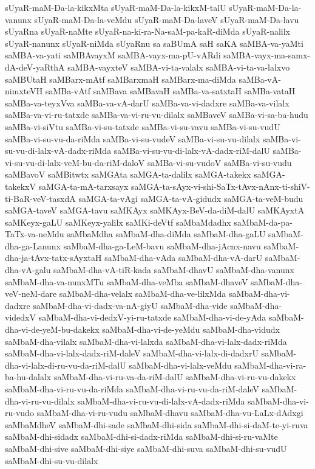 {sUyaR-maM-Da-la-kikxMta
sUyaR-maM-Da-la-kikxM-talU
sUyaR-maM-Da-la-vanunx
sUyaR-maM-Da-la-veMdu
sUyaR-maM-Da-laveV
sUyaR-maM-Da-lavu
sUyaRna
sUyaR-naMte
sUyaR-na-ki-ra-Na-saM-pa-kaR-diMda
sUyaR-nalilx
sUyaR-nanunx
sUyaR-niMda
sUyaRnu
sa
saBUmA
saH
saKA
saMBA-va-yaMti
saMBA-va-yati
saMBAvayxM
saMBA-vayx-ma-pU-vARdi
saMBA-vayx-ma-samx-dA-deV-yaRthA
saMBA-vayxteV
saMBA-vi-ta-valalx
saMBA-vi-ta-va-lalxvo
saMBUtaH
saMBarx-mAtf
saMBarxmaH
saMBarx-ma-diMda
saMBa-vA-nimxteVH
saMBa-vAtf
saMBava
saMBavaH
saMBa-va-satxtaH
saMBa-vataH
saMBa-va-teyxVva
saMBa-va-vA-darU
saMBa-va-vi-dadxre
saMBa-va-vilalx
saMBa-va-vi-ru-tatxde
saMBa-va-vi-ru-vu-dilalx
saMBaveV
saMBa-vi-sa-ba-hudu
saMBa-vi-siVtu
saMBa-vi-su-tatxde
saMBa-vi-su-vavu
saMBa-vi-su-vudU
saMBa-vi-su-vu-da-riMda
saMBa-vi-su-vudeV
saMBa-vi-su-vu-dilalx
saMBa-vi-su-vu-di-lalx-vA-dadx-riMda
saMBa-vi-su-vu-di-lalx-vA-dadx-riM-dalU
saMBa-vi-su-vu-di-lalx-veM-bu-da-riM-daloV
saMBa-vi-su-vudoV
saMBa-vi-su-vudu
saMBavoV
saMBitwtx
saMGAta
saMGA-ta-dalilx
saMGA-takekx
saMGA-takekxV
saMGA-ta-mA-tarxsayx
saMGA-ta-sAyx-vi-shi-SaTx-tAvx-nAnx-ti-shiV-ti-BaR-veV-tasxdA
saMGA-ta-vAgi
saMGA-ta-vA-gidudx
saMGA-ta-veM-budu
saMGA-taveV
saMGA-tavu
saMKAyx
saMKAyx-BeV-da-diM-dalU
saMKAyxtA
saMKeyx-gaLU
saMKeyx-yalilx
saMKi-deVtf
saMbaMdadhx
saMbaM-da-pa-TaTx-va-neMdu
saMbaMdha
saMbaM-dha-diMda
saMbaM-dha-gaLU
saMbaM-dha-ga-Lanunx
saMbaM-dha-ga-LeM-bavu
saMbaM-dha-jAcnx-navu
saMbaM-dha-ja-tAvx-tatx-sAyxtaH
saMbaM-dha-vAda
saMbaM-dha-vA-darU
saMbaM-dha-vA-galu
saMbaM-dha-vA-tiR-kada
saMbaM-dhavU
saMbaM-dha-vanunx
saMbaM-dha-va-nunxMTu
saMbaM-dha-veMba
saMbaM-dhaveV
saMbaM-dha-veV-neM-dare
saMbaM-dha-velalx
saMbaM-dha-ve-lilxMda
saMbaM-dha-vi-dadxre
saMbaM-dha-vi-dadx-va-nA-giyU
saMbaM-dha-vide
saMbaM-dha-videdxV
saMbaM-dha-vi-dedxV-yi-ru-tatxde
saMbaM-dha-vi-de-yAda
saMbaM-dha-vi-de-yeM-bu-dakekx
saMbaM-dha-vi-de-yeMdu
saMbaM-dha-vidudx
saMbaM-dha-vilalx
saMbaM-dha-vi-lalxda
saMbaM-dha-vi-lalx-dadx-riMda
saMbaM-dha-vi-lalx-dadx-riM-daleV
saMbaM-dha-vi-lalx-di-dadxrU
saMbaM-dha-vi-lalx-di-ru-vu-da-riM-dalU
saMbaM-dha-vi-lalx-veMdu
saMbaM-dha-vi-ra-ba-hu-dalalx
saMbaM-dha-vi-ru-va-da-riM-dalU
saMbaM-dha-vi-ru-vu-dakekx
saMbaM-dha-vi-ru-vu-da-riMda
saMbaM-dha-vi-ru-vu-da-riM-daleV
saMbaM-dha-vi-ru-vu-dilalx
saMbaM-dha-vi-ru-vu-di-lalx-vA-dadx-riMda
saMbaM-dha-vi-ru-vudo
saMbaM-dha-vi-ru-vudu
saMbaM-dhavu
saMbaM-dha-vu-LaLx-dAdxgi
saMbaMdheV
saMbaM-dhi-sade
saMbaM-dhi-sida
saMbaM-dhi-si-daM-te-yi-ruva
saMbaM-dhi-sidadx
saMbaM-dhi-si-dadx-riMda
saMbaM-dhi-si-ru-vaMte
saMbaM-dhi-sive
saMbaM-dhi-siye
saMbaM-dhi-suva
saMbaM-dhi-su-vudU
saMbaM-dhi-su-vu-dilalx
}
